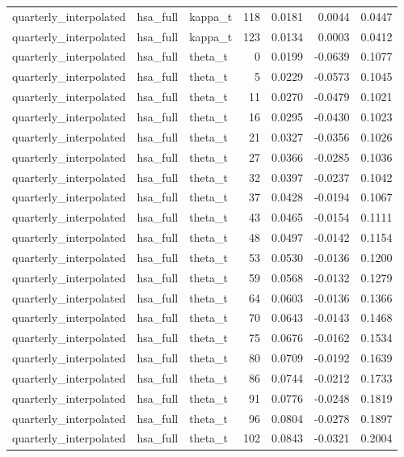 \begin{tabular}{lllrrrr}
quarterly\_interpolated & hsa\_full & kappa\_t & 118 & 0.0181 & 0.0044 & 0.0447 \\
quarterly\_interpolated & hsa\_full & kappa\_t & 123 & 0.0134 & 0.0003 & 0.0412 \\
quarterly\_interpolated & hsa\_full & theta\_t & 0 & 0.0199 & -0.0639 & 0.1077 \\
quarterly\_interpolated & hsa\_full & theta\_t & 5 & 0.0229 & -0.0573 & 0.1045 \\
quarterly\_interpolated & hsa\_full & theta\_t & 11 & 0.0270 & -0.0479 & 0.1021 \\
quarterly\_interpolated & hsa\_full & theta\_t & 16 & 0.0295 & -0.0430 & 0.1023 \\
quarterly\_interpolated & hsa\_full & theta\_t & 21 & 0.0327 & -0.0356 & 0.1026 \\
quarterly\_interpolated & hsa\_full & theta\_t & 27 & 0.0366 & -0.0285 & 0.1036 \\
quarterly\_interpolated & hsa\_full & theta\_t & 32 & 0.0397 & -0.0237 & 0.1042 \\
quarterly\_interpolated & hsa\_full & theta\_t & 37 & 0.0428 & -0.0194 & 0.1067 \\
quarterly\_interpolated & hsa\_full & theta\_t & 43 & 0.0465 & -0.0154 & 0.1111 \\
quarterly\_interpolated & hsa\_full & theta\_t & 48 & 0.0497 & -0.0142 & 0.1154 \\
quarterly\_interpolated & hsa\_full & theta\_t & 53 & 0.0530 & -0.0136 & 0.1200 \\
quarterly\_interpolated & hsa\_full & theta\_t & 59 & 0.0568 & -0.0132 & 0.1279 \\
quarterly\_interpolated & hsa\_full & theta\_t & 64 & 0.0603 & -0.0136 & 0.1366 \\
quarterly\_interpolated & hsa\_full & theta\_t & 70 & 0.0643 & -0.0143 & 0.1468 \\
quarterly\_interpolated & hsa\_full & theta\_t & 75 & 0.0676 & -0.0162 & 0.1534 \\
quarterly\_interpolated & hsa\_full & theta\_t & 80 & 0.0709 & -0.0192 & 0.1639 \\
quarterly\_interpolated & hsa\_full & theta\_t & 86 & 0.0744 & -0.0212 & 0.1733 \\
quarterly\_interpolated & hsa\_full & theta\_t & 91 & 0.0776 & -0.0248 & 0.1819 \\
quarterly\_interpolated & hsa\_full & theta\_t & 96 & 0.0804 & -0.0278 & 0.1897 \\
quarterly\_interpolated & hsa\_full & theta\_t & 102 & 0.0843 & -0.0321 & 0.2004 \\

\end{tabular}
